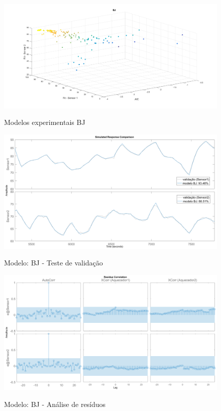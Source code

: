\begin{apendicesenv}
\begin{figure}[h]
	\caption{Modelos experimentais BJ}
	\begin{center}
		\includegraphics[width=1.00\textwidth]{./5_images/tclabsp-models-BJ.png} 
		\label{fig:tclabsp-models-bj}
	\end{center}
	\centering
\end{figure}

\begin{figure}
	\caption{Modelo: BJ - Teste de validação}
	\begin{center}
		\includegraphics[width=1.00\textwidth]{./5_images/tclabsp-models-BJ-compare.png} 
		\label{fig:tclabsp-models-bj-compare}
	\end{center}
	\centering
\end{figure}

\begin{figure}
	\caption{Modelo: BJ - Análise de resíduos}
	\begin{center}
		\includegraphics[width=1.00\textwidth]{./5_images/tclabsp-models-BJ-resid.png} 
		\label{fig:tclabsp-models-bj-resid}
	\end{center}
	\centering
\end{figure}


\end{apendicesenv}
